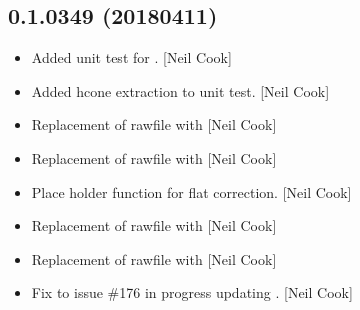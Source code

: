 \documentclass[a4paper,10pt,english]{report}
\begin{document}
\subsection{0.1.0349 (2018\sphinxhyphen{}04\sphinxhyphen{}11)}
\label{\detokenize{misc/changelog:id484}}\begin{itemize}
\item {} 
Added unit test for . {[}Neil Cook{]}

\item {} 
Added hcone extraction to unit test. {[}Neil Cook{]}

\item {} 
Replacement of rawfile with  {[}Neil Cook{]}

\item {} 
Replacement of rawfile with  {[}Neil Cook{]}

\item {} 
Place holder function for flat correction. {[}Neil Cook{]}

\item {} 
Replacement of rawfile with  {[}Neil Cook{]}

\item {} 
Replacement of rawfile with  {[}Neil Cook{]}

\item {} 
Fix to issue \#176 \sphinxhyphen{} in progress \sphinxhyphen{} updating . {[}Neil Cook{]}

\end{itemize}
\end{document}
